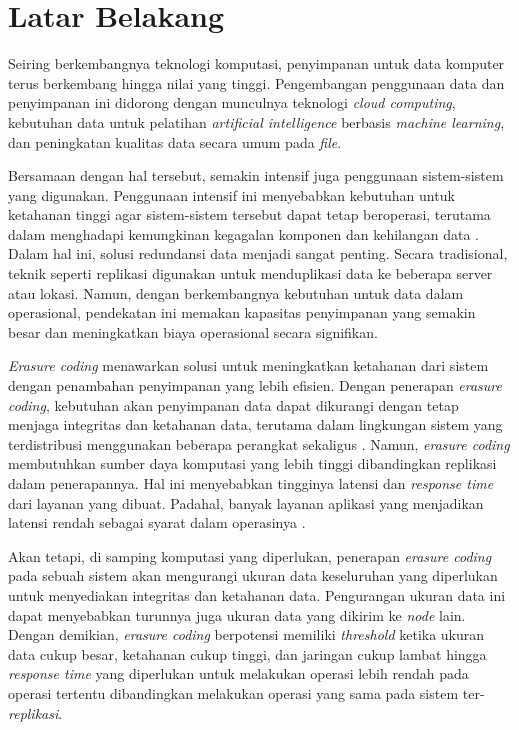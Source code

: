 \section{Latar Belakang}
\label{sec:latar-belakang}

Seiring berkembangnya teknologi komputasi, penyimpanan untuk data komputer terus berkembang hingga nilai yang tinggi. Pengembangan penggunaan data dan penyimpanan ini didorong dengan munculnya teknologi \textit{cloud computing}, kebutuhan data untuk pelatihan \textit{artificial intelligence} berbasis \textit{machine learning}, dan peningkatan kualitas data secara umum pada \textit{file}.

Bersamaan dengan hal tersebut, semakin intensif juga penggunaan sistem-sistem yang digunakan. Penggunaan intensif ini menyebabkan kebutuhan untuk ketahanan tinggi agar sistem-sistem tersebut dapat tetap beroperasi, terutama dalam menghadapi kemungkinan kegagalan komponen dan kehilangan data \parencite{weatherspoon2002erasure}. Dalam hal ini, solusi redundansi data menjadi sangat penting. Secara tradisional, teknik seperti replikasi digunakan untuk menduplikasi data ke beberapa server atau lokasi. Namun, dengan berkembangnya kebutuhan untuk data dalam operasional, pendekatan ini memakan kapasitas penyimpanan yang semakin besar dan meningkatkan biaya operasional secara signifikan.

\textit{Erasure coding} menawarkan solusi untuk meningkatkan ketahanan dari sistem dengan penambahan penyimpanan yang lebih efisien. Dengan penerapan \textit{erasure coding}, kebutuhan akan penyimpanan data dapat dikurangi dengan tetap menjaga integritas dan ketahanan data, terutama dalam lingkungan sistem yang terdistribusi menggunakan beberapa perangkat sekaligus \parencite{balaji2018erasure}. Namun, \textit{erasure coding} membutuhkan sumber daya komputasi yang lebih tinggi dibandingkan replikasi dalam penerapannya. Hal ini menyebabkan tingginya latensi dan \textit{response time} dari layanan yang dibuat. Padahal, banyak layanan aplikasi yang menjadikan latensi rendah sebagai syarat dalam operasinya \parencite{dean2013tail}.

Akan tetapi, di samping komputasi yang diperlukan, penerapan \textit{erasure coding} pada sebuah sistem akan mengurangi ukuran data keseluruhan yang diperlukan untuk menyediakan integritas dan ketahanan data. Pengurangan ukuran data ini dapat menyebabkan turunnya juga ukuran data yang dikirim ke \textit{node} lain. Dengan demikian, \textit{erasure coding} berpotensi memiliki \textit{threshold} ketika ukuran data cukup besar, ketahanan cukup tinggi, dan jaringan cukup lambat hingga \textit{response time} yang diperlukan untuk melakukan operasi lebih rendah pada operasi tertentu dibandingkan melakukan operasi yang sama pada sistem ter-\textit{replikasi}.

